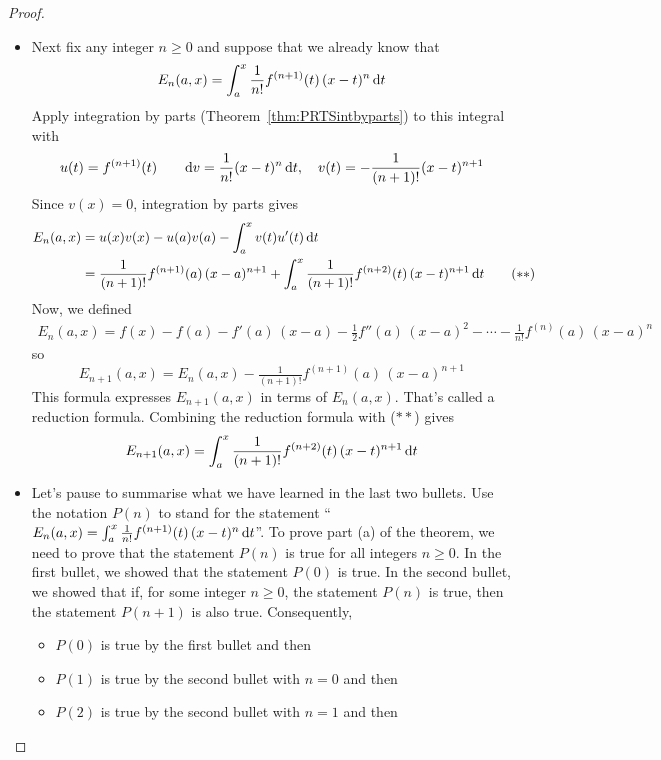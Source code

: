 \begin{proof}
\begin{enumerate}[(a)]
\begin{itemize}
\item
Next fix any integer $n\ge 0$ and suppose that we already know  that 
\begin{equation*}
 E_n(a,x)=\int_a^x \frac{1}{n!}f^{(n+1)}(t)\, (x-t)^n\,\mathrm{d}t
\end{equation*}
Apply integration by parts (Theorem~\ref{thm:PRTSintbyparts}) to this integral with
\begin{equation*}
u(t)=f^{(n+1)}(t)\qquad
\mathrm{d}v= \frac{1}{n!}(x-t)^n\,\mathrm{d}t,\quad 
v(t)=- \frac{1}{(n+1)!}(x-t)^{n+1}
\end{equation*}
Since $v(x)=0$, integration by parts gives
\begin{align*}
E_n(a,x)&=u(x)v(x)-u(a)v(a)-\int_a^x v(t) u'(t)\,\mathrm{d}t \\
   &=\frac{1}{(n+1)!}f^{(n+1)}(a)\, (x-a)^{n+1}
    +\int_a^x \frac{1}{(n+1)!}f^{(n+2)}(t)\, (x-t)^{n+1}\,\mathrm{d}t
\tag{$**$}\end{align*}
Now, we defined
\begin{align*}
E_n(a,x) = f(x) - f(a) -f'(a)\,(x-a)-\tfrac{1}{2}f''(a)\,(x-a)^2
                      -\cdots-\tfrac{1}{n!}f^{(n)}(a)\, (x-a)^n
\end{align*}
so
\begin{equation*}
E_{n+1}(a,x) = E_n(a,x)-\tfrac{1}{(n+1)!}f^{(n+1)}(a)\, (x-a)^{n+1}
\end{equation*}
This formula expresses $E_{n+1}(a,x)$ in terms of $E_n(a,x)$. That's called a
reduction formula.
Combining the reduction formula with ($**$) gives
\begin{equation*}
E_{n+1}(a,x)=\int_a^x \frac{1}{(n+1)!}f^{(n+2)}(t)\, (x-t)^{n+1}\,\mathrm{d}t
\end{equation*}
\item 
Let's pause to summarise what we have learned in the last two bullets.
Use the notation $P(n)$ to stand for the statement 
``$E_n(a,x)=\int_a^x \frac{1}{n!}f^{(n+1)}(t)\, (x-t)^n\,\mathrm{d}t$''.
To prove part (a) of the theorem, we need to prove that the statement $P(n)$
is true for all integers $n\ge 0$.
In the first bullet, we showed that the statement $P(0)$ is true.
In the second bullet, we showed that if, for some integer $n\ge 0$,
the statement $P(n)$ is true, then the statement $P(n+1)$ is also true. 
Consequently,
\begin{itemize}
\item $P(0)$ is true by the first bullet and then
\item $P(1)$ is true by the second bullet with $n=0$ and then
\item $P(2)$ is true by the second bullet with $n=1$ and then

\end{itemize}
\end{itemize}
\end{enumerate}
\end{proof}

